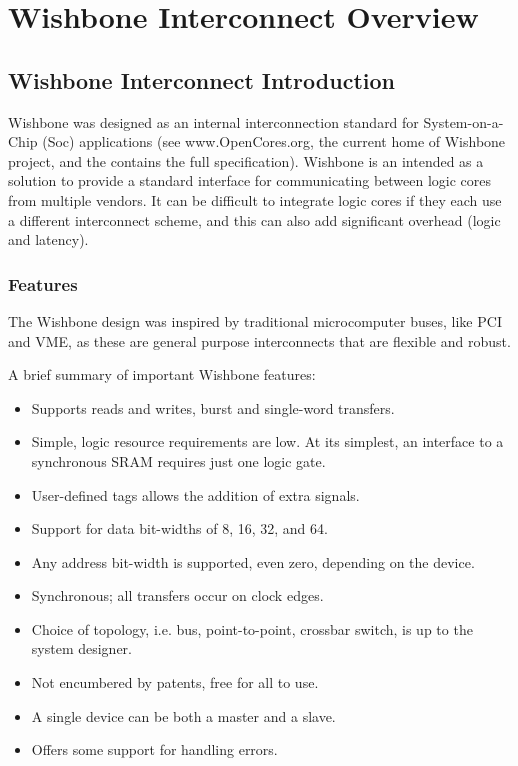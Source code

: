 \chapter{Wishbone Interconnect Overview}
\label{APP_Wishbone}

\section{Wishbone Interconnect Introduction}
Wishbone was designed as an internal interconnection standard for
System-on-a-Chip (Soc) applications (see www.OpenCores.org, the current home of
Wishbone project, and the contains the full specification). Wishbone is an
intended as a solution to provide a standard interface for communicating
between logic cores from multiple vendors. It can be difficult to
integrate logic cores if they each use a different interconnect scheme, and
this can also add significant overhead (logic and latency).

\subsection{Features}
The Wishbone design was inspired by traditional microcomputer
buses\cite{WB3_Spec}, like PCI and VME, as these are general purpose
interconnects that are flexible and robust.

A brief summary of important Wishbone features:
\begin{itemize}
  \item Supports reads and writes, burst and single-word transfers.
  \item Simple, logic resource requirements are low. At its simplest, an
  interface to a synchronous SRAM requires just one logic gate.
  \item User-defined tags allows the addition of extra signals.
  \item Support for data bit-widths of 8, 16, 32, and 64.
  \item Any address bit-width is supported, even zero, depending on the device.
  \item Synchronous; all transfers occur on clock edges.
  \item Choice of topology, i.e. bus, point-to-point, crossbar switch, is up to
  the system designer.
  \item Not encumbered by patents, free for all to use.
  \item A single device can be both a master and a slave.
  \item Offers some support for handling errors.
\end{itemize}


